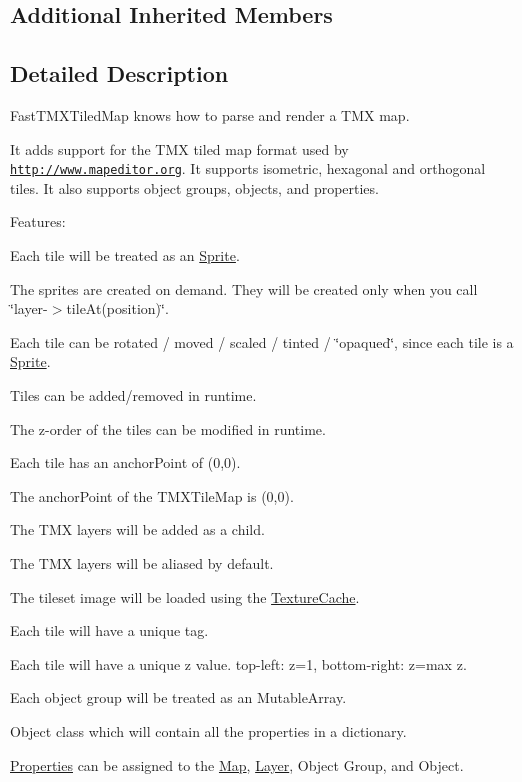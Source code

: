 \subsection*{Additional Inherited Members}


\subsection{Detailed Description}
Fast\+T\+M\+X\+Tiled\+Map knows how to parse and render a T\+MX map. 

It adds support for the T\+MX tiled map format used by \href{http://www.mapeditor.org}{\tt http\+://www.\+mapeditor.\+org}. It supports isometric, hexagonal and orthogonal tiles. It also supports object groups, objects, and properties.

Features\+:
\begin{DoxyItemize}
\item Each tile will be treated as an \hyperlink{classSprite}{Sprite}.
\item The sprites are created on demand. They will be created only when you call \char`\"{}layer-\/$>$tile\+At(position)\char`\"{}.
\item Each tile can be rotated / moved / scaled / tinted / \char`\"{}opaqued\char`\"{}, since each tile is a \hyperlink{classSprite}{Sprite}.
\item Tiles can be added/removed in runtime.
\item The z-\/order of the tiles can be modified in runtime.
\item Each tile has an anchor\+Point of (0,0).
\item The anchor\+Point of the T\+M\+X\+Tile\+Map is (0,0).
\item The T\+MX layers will be added as a child.
\item The T\+MX layers will be aliased by default.
\item The tileset image will be loaded using the \hyperlink{classTextureCache}{Texture\+Cache}.
\item Each tile will have a unique tag.
\item Each tile will have a unique z value. top-\/left\+: z=1, bottom-\/right\+: z=max z.
\item Each object group will be treated as an Mutable\+Array.
\item Object class which will contain all the properties in a dictionary.
\item \hyperlink{classProperties}{Properties} can be assigned to the \hyperlink{classMap}{Map}, \hyperlink{classLayer}{Layer}, Object Group, and Object.
\end{DoxyItemize}

